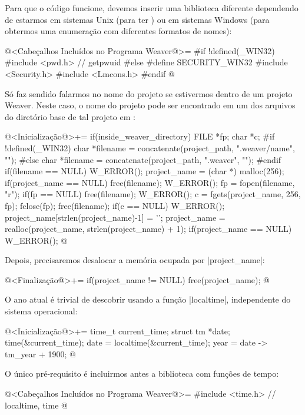 {Para que o código funcione, devemos inserir uma biblioteca diferente
dependendo de estarmos em sistemas Unix (para
ter ) ou em sistemas Windows (para obtermos uma
enumeração com diferentes formatos de nomes):

@<Cabeçalhos Incluídos no Programa Weaver@>=
#if !defined(_WIN32)
#include <pwd.h> // getpwuid
#else
#define SECURITY_WIN32
#include <Security.h>
#include <Lmcons.h>
#endif
@


Só faz sendido falarmos no nome do projeto se estivermos dentro de um
projeto Weaver. Neste caso, o nome do projeto pode ser encontrado em
um dos arquivos do diretório base de tal projeto em
:

\iniciocodigo
@<Inicialização@>+=
if(inside_weaver_directory){
  FILE *fp;
  char *c;
#if !defined(_WIN32)
  char *filename = concatenate(project_path, ".weaver/name", "");
#else
  char *filename = concatenate(project_path, ".weaver\name", "");
#endif
  if(filename == NULL) W_ERROR();
  project_name = (char *) malloc(256);
  if(project_name == NULL){
    free(filename);
    W_ERROR();
  }
  fp = fopen(filename, "r");
  if(fp == NULL){
    free(filename);
    W_ERROR();
  }
  c = fgets(project_name, 256, fp);
  fclose(fp);
  free(filename);
  if(c == NULL) W_ERROR();
  project_name[strlen(project_name)-1] = '\0';
  project_name = realloc(project_name, strlen(project_name) + 1);
  if(project_name == NULL) W_ERROR();
}
@
\fimcodigo

Depois, precisaremos desalocar a memória ocupada por |project_name|:

\iniciocodigo
@<Finalização@>+=
if(project_name != NULL) free(project_name);
@
\fimcodigo


O ano atual é trivial de descobrir usando a função |localtime|,
independente do sistema operacional:

\iniciocodigo
@<Inicialização@>+=
{
  time_t current_time;
  struct tm *date;
  time(&current_time);
  date = localtime(&current_time);
  year = date -> tm_year + 1900;
}
@
\fimcodigo

O único pré-requisito é incluirmos antes a biblioteca com funções de
tempo:

\iniciocodigo
@<Cabeçalhos Incluídos no Programa Weaver@>=
#include <time.h> // localtime, time
@
\fimcodigo


}
